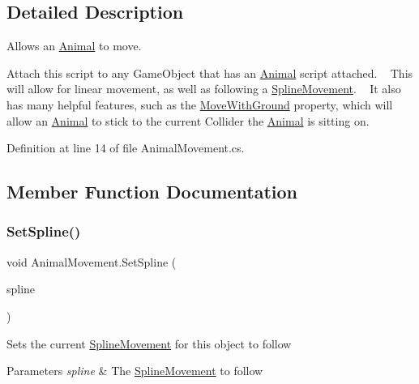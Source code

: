 \subsection{Detailed Description}
Allows an \mbox{\hyperlink{class_animal}{Animal}} to move. 

Attach this script to any Game\+Object that has an \mbox{\hyperlink{class_animal}{Animal}} script attached. ~\newline
 This will allow for linear movement, as well as following a \mbox{\hyperlink{class_spline_movement}{Spline\+Movement}}. ~\newline
It also has many helpful features, such as the \mbox{\hyperlink{class_animal_movement_a60fedb1b7c82f4d2322253dbdc3d82f9}{Move\+With\+Ground}} property, which will allow an \mbox{\hyperlink{class_animal}{Animal}} to stick to the current Collider the \mbox{\hyperlink{class_animal}{Animal}} is sitting on. 

Definition at line 14 of file Animal\+Movement.\+cs.



\subsection{Member Function Documentation}
\mbox{\label{class_animal_movement_a7da29b5a06c968139cb342c2508d9cc7}} 
\subsubsection{\texorpdfstring{Set\+Spline()}{SetSpline()}}
{\footnotesize\ttfamily void Animal\+Movement.\+Set\+Spline (\begin{DoxyParamCaption}\item[{\mbox{\hyperlink{class_spline_movement}{Spline\+Movement}}}]{spline }\end{DoxyParamCaption})}



Sets the current \mbox{\hyperlink{class_spline_movement}{Spline\+Movement}} for this object to follow 


\begin{DoxyParams}{Parameters}
{\em spline} & The \mbox{\hyperlink{class_spline_movement}{Spline\+Movement}} to follow\\
\hline
\end{DoxyParams}


